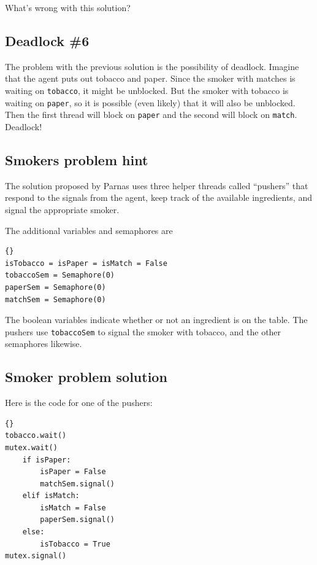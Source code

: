\documentclass{book}
\newcommand{\clearemptydoublepage}{\newpage\cleardoublepage}
\begin{document}
What's wrong with this solution?

\clearemptydoublepage
\subsection{Deadlock \#6}

The problem with the previous solution is the possibility
of deadlock.  Imagine that the agent puts out tobacco and
paper.  Since the smoker with matches is waiting on {\tt tobacco},
it might be unblocked.  But the smoker with tobacco is
waiting on {\tt paper}, so it is possible (even likely) that
it will also be unblocked.  Then the first thread will block
on {\tt paper} and the second will block on {\tt match}.
Deadlock!

\clearemptydoublepage
\subsection{Smokers problem hint}

The solution proposed by Parnas uses three helper threads
called ``pushers'' that respond to the signals from the agent,
keep track of the available ingredients, and signal the
appropriate smoker.

The additional variables and semaphores are

\begin{latin}
\begin{latin}
\begin{lstlisting}[title={Smokers problem hint}]{}
isTobacco = isPaper = isMatch = False
tobaccoSem = Semaphore(0)
paperSem = Semaphore(0)
matchSem = Semaphore(0)
\end{lstlisting}
\end{latin}
\end{latin}

The boolean variables indicate whether or not an ingredient
is on the table.  The pushers use {\tt tobaccoSem} to signal
the smoker with tobacco, and the other semaphores likewise.


\clearemptydoublepage
\subsection{Smoker problem solution}

Here is the code for one of the pushers:

\begin{latin}
\begin{latin}
\begin{lstlisting}[title={Pusher A}]{}
tobacco.wait()
mutex.wait()
    if isPaper:
        isPaper = False
        matchSem.signal()
    elif isMatch:
        isMatch = False
        paperSem.signal()
    else: 
        isTobacco = True
mutex.signal()
\end{lstlisting}
\end{latin}
\end{latin}
\end{document}
